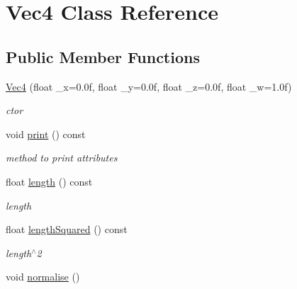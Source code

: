 \hypertarget{classVec4}{
\section{Vec4 Class Reference}
\label{classVec4}
}
\subsection*{Public Member Functions}
\begin{DoxyCompactItemize}
\item 
\hyperlink{classVec4_aa433bf04a2457800e141c7df59d72763}{Vec4} (float \_\-x=0.0f, float \_\-y=0.0f, float \_\-z=0.0f, float \_\-w=1.0f)
\begin{DoxyCompactList}\small\item\em ctor \item\end{DoxyCompactList}\item 
\hypertarget{classVec4_ad64cc540a46a7b1795aa20c59e9d9610}{
void \hyperlink{classVec4_ad64cc540a46a7b1795aa20c59e9d9610}{print} () const }
\label{classVec4_ad64cc540a46a7b1795aa20c59e9d9610}

\begin{DoxyCompactList}\small\item\em method to print attributes \item\end{DoxyCompactList}\item 
\hypertarget{classVec4_a08573e03357a6d14294da98c46cbab58}{
float \hyperlink{classVec4_a08573e03357a6d14294da98c46cbab58}{length} () const }
\label{classVec4_a08573e03357a6d14294da98c46cbab58}

\begin{DoxyCompactList}\small\item\em length \item\end{DoxyCompactList}\item 
\hypertarget{classVec4_ae2413a4eb232a55f15bafa13e49e75b7}{
float \hyperlink{classVec4_ae2413a4eb232a55f15bafa13e49e75b7}{lengthSquared} () const }
\label{classVec4_ae2413a4eb232a55f15bafa13e49e75b7}

\begin{DoxyCompactList}\small\item\em length$^\wedge$2 \item\end{DoxyCompactList}\item 
\hypertarget{classVec4_ad503d54fd2f2f58ec0dbfcabe0d4c0e4}{
void \hyperlink{classVec4_ad503d54fd2f2f58ec0dbfcabe0d4c0e4}{normalise} ()}
\label{classVec4_ad503d54fd2f2f58ec0dbfcabe0d4c0e4}


\end{DoxyCompactItemize}
